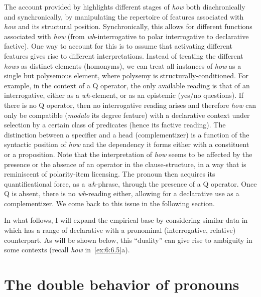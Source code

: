 \documentclass[output=paper]{langsci/langscibook}
\begin{document}
The account provided by \citet{vanGelderen2015} highlights different stages of
\emph{how} both diachronically and synchronically, by manipulating the
repertoire of features associated with \emph{how} and its structural position.
Synchronically, this allows for different functions associated with \emph{how}
(from \emph{wh}-interrogative to polar interrogative to declarative factive). One way
to account for this is to assume that activating different features gives rise
to different interpretations. Instead of treating the different \emph{hows} as
distinct elements (homonyms), we can treat all instances of \emph{how} as a
single but polysemous element, where polysemy is struc\-tu\-ral\-ly-con\-di\-tio\-ned. For
example, in the context of a Q operator, the only available reading is that of
an interrogative, either as a \emph{wh}-element, or as an epistemic (yes/no
questions). If there is no Q operator, then no interrogative reading arises and
therefore \emph{how} can only be compatible (\emph{modulo} its degree feature)
with a declarative context under selection by a certain class of predicates
(hence its factive reading). The distinction between a specifier and a head
(complementizer) is a function of the syntactic position of \emph{how} and the
dependency it forms either with a constituent or a proposition. Note that the
interpretation of \emph{how} seems to be affected by the presence or the
absence of an operator in the clause-structure, in a way that is reminiscent of
polarity-item licensing. The pronoun then acquires its quantificational force,
as a \emph{wh}-phrase, through the presence of a Q operator. Once Q is absent, there
is no \emph{wh}-reading either, allowing for a declarative use as a complementizer. We
come back to this issue in the following section.

In what follows, I will expand the empirical base by considering similar data
in  which has a range of declarative  with a
pronominal (interrogative, relative) counterpart. As will be shown below, this
\enquote{duality} can give rise to ambiguity in some contexts (recall
\emph{how} in~\ref{ex:6:6.5}a).

\section{The double behavior of pronouns}\label{sec:double-pron}
\end{document}
